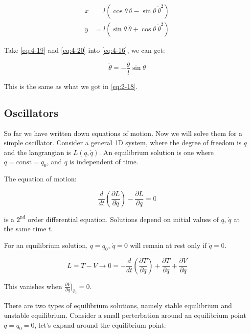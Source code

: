\begin{align}
    \label{eq:4-19}
    \ddot{x} &= l\left(\cos \theta \ \ddot{\theta} - \sin \theta \ \dot{\theta}^2\right) \\
    \label{eq:4-20}
    \ddot{y} &= l\left(\sin \theta \ \ddot{\theta} + \cos \theta \ \dot{\theta}^2\right)
\end{align}

Take \ref{eq:4-19} and \ref{eq:4-20} into \ref{eq:4-16}, we can get:

\begin{equation}
    \ddot{\theta} = -\frac{g}{l} \sin \theta
\end{equation}

This is the same as what we got in \ref{eq:2-18}.

\subsection{Oscillators}

So far we have written down equations of motion. Now we will solve them for a simple oscillator. Consider a general 1D system, where the degree of freedom is $q$ and the langrangian is $L\left(q, \dot{q}\right)$. An equilibrium solution is one where $q = \text{const} = q_0$, and $q$ is independent of time.

The equation of motion:

\begin{equation}
    \frac{d}{dt} \left(\frac{\partial L}{\partial \dot{q}}\right) - \frac{\partial L}{\partial q} = 0
\end{equation}

is a $2^\text{nd}$ order differential equation. Solutions depend on initial values of $q$, $\dot{q}$ at the same time $t$.

For an equilibrium solution, $q = q_0$, $\dot{q} = 0$ will remain at rest only if $\ddot{q} = 0$.

\begin{equation}
    L = T - V \rightarrow 0 = - \frac{d}{dt} \left(\frac{\partial T}{\partial \dot{q}}\right) + \frac{\partial T}{\partial q} + \frac{\partial V}{\partial q}
\end{equation}

This vanishes when $\frac{\partial V}{\partial q} \big |_{q_0} = 0$.

There are two types of equilibrium solutions, namely stable equilibrium and unstable equilibrium. Consider a small perterbation around an equilibrium point $q=q_0=0$, let's expand around the equilibrium point:

